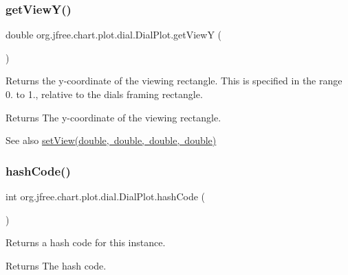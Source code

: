 \subsubsection{\texorpdfstring{get\+View\+Y()}{getViewY()}}
{\footnotesize\ttfamily double org.\+jfree.\+chart.\+plot.\+dial.\+Dial\+Plot.\+get\+ViewY (\begin{DoxyParamCaption}{ }\end{DoxyParamCaption})}

Returns the y-\/coordinate of the viewing rectangle. This is specified in the range 0. to 1., relative to the dial\textquotesingle{}s framing rectangle.

\begin{DoxyReturn}{Returns}
The y-\/coordinate of the viewing rectangle.
\end{DoxyReturn}
\begin{DoxySeeAlso}{See also}
\mbox{\hyperlink{classorg_1_1jfree_1_1chart_1_1plot_1_1dial_1_1_dial_plot_ac66e780fbd6679eed711805ba1d47d77}{set\+View(double, double, double, double)}} 
\end{DoxySeeAlso}
\mbox{\label{classorg_1_1jfree_1_1chart_1_1plot_1_1dial_1_1_dial_plot_a3780e1153380d4ee9340c01e2461d727}} 
\subsubsection{\texorpdfstring{hash\+Code()}{hashCode()}}
{\footnotesize\ttfamily int org.\+jfree.\+chart.\+plot.\+dial.\+Dial\+Plot.\+hash\+Code (\begin{DoxyParamCaption}{ }\end{DoxyParamCaption})}

Returns a hash code for this instance.

\begin{DoxyReturn}{Returns}
The hash code. 
\end{DoxyReturn}
\mbox{\label{classorg_1_1jfree_1_1chart_1_1plot_1_1dial_1_1_dial_plot_ac5110fce422dc6bf4a1ac579b3aec666}} 
